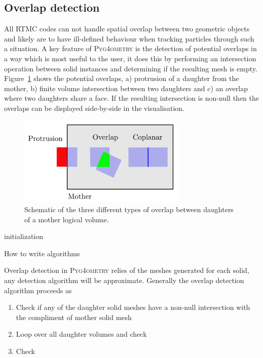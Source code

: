 \documentclass[final,5p,times,twocolumn]{elsarticle}
\newcommand{\PYGEOMETRY}{\textsc{Pyg4ometry}}
\begin{document}
\subsection{Overlap detection}
All RTMC codes can not handle spatial overlap between two geometric objects and likely are to have ill-defined behaviour when tracking particles  
through such a situation.  A key feature of \PYGEOMETRY{} is the detection of potential overlaps in a way which is most useful to the user, it does this by performing an intersection operation between solid instances and determining if the resulting mesh is empty. Figure~\ref{fig:overlap} shows the potential overlaps, a) protrusion of a daughter from the mother, b)  finite volume intersection between two daughters  and c) an overlap where two daughters share a face. If the resulting intersection 
is non-null then the overlaps can be displayed side-by-side in the visualisation. 
\begin{figure}[htbp]
\begin{center}
\includegraphics[width=8cm]{./diagrams/overlap.pdf}
\caption{Schematic of the three different types of overlap between daughters of a mother logical volume.}
\label{fig:overlap}
\end{center}
\end{figure} 

\begin{algorithm}[h]
\SetAlgoLined
{}
 initialization\;
 \caption{How to write algorithms}
\end{algorithm}

Overlap detection in \PYGEOMETRY{} relies of the meshes generated for each solid, 
any detection algorithm will be approximate. Generally the overlap detection 
algorithm proceeds as 
\begin{enumerate}
\item Check if any of the daughter solid meshes have a non-null intersection with the compliment of mother solid mesh
\item Loop over all daughter volumes and check
\item Check
\end{enumerate}
\end{document}
